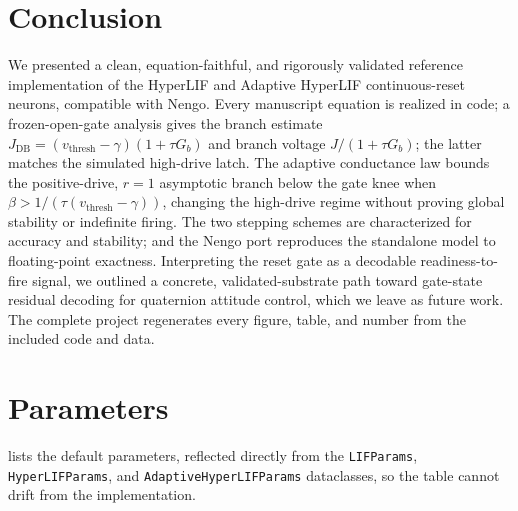 \documentclass[journal]{IEEEtran}
\newcommand{\vth}{v_{\mathrm{thresh}}}
\newcommand{\Gb}{G_{b}}
\newcommand{\Jdb}{J_{\mathrm{DB}}}
\newcommand{\code}[1]{\texttt{#1}}
\begin{document}
\section{Conclusion}\label{sec:conclusion}
We presented a clean, equation-faithful, and rigorously validated reference
implementation of the HyperLIF and Adaptive HyperLIF continuous-reset neurons,
compatible with Nengo. Every manuscript equation is realized in code; a
frozen-open-gate analysis gives the branch estimate
$\Jdb=(\vth-\gamma)(1+\tau\Gb)$ and branch voltage $J/(1+\tau\Gb)$; the latter
matches the simulated high-drive latch. The adaptive conductance law bounds the
positive-drive, $r=1$ asymptotic branch below the gate knee when
$\beta>1/(\tau(\vth-\gamma))$, changing the high-drive regime without proving
global stability or indefinite firing. The two stepping schemes
are characterized for accuracy and stability; and the Nengo port reproduces the
standalone model to floating-point exactness. Interpreting the reset gate as a
decodable readiness-to-fire signal, we outlined a concrete, validated-substrate
path toward gate-state residual decoding for quaternion attitude control, which
we leave as future work. The complete project regenerates every figure, table,
and number from the included code and data.

\appendices
\section{Parameters}\label{app:params}
 lists the default parameters, reflected directly from the
\code{LIFParams}, \code{HyperLIFParams}, and \code{AdaptiveHyperLIFParams}
dataclasses, so the table cannot drift from the implementation.
\end{document}
